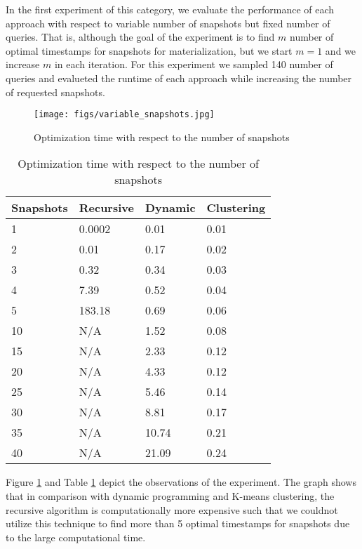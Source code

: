 In the first experiment of this category, we evaluate the performance of each approach with respect to variable number of snapshots but fixed number of queries. That is, although the goal of the experiment is to find $m$ number of optimal timestamps for snapshots for materialization, but we start $m=1$ and we increase $m$ in each iteration. For this experiment we sampled 140 number of queries and evalueted the runtime of each approach while increasing the number of requested snapshots.

\begin{figure}
	\label{fig:variable_snapshots}
	\centering
	\texttt{[image: figs/variable\_snapshots.jpg]}
	\caption{Optimization time with respect to the number of snapshots}
\end{figure} 


\begin {center}
\begin{table}
	\centering
	\caption{Optimization time with respect to the number of snapshots}
	\label {table:variable_snapshots}
	\begin{tabular}{p{2cm}p{3cm}p{3cm}p{3cm}}
		\hline
		Snapshots & Recursive      & Dynamic  & Clustering \\ \hline
		1 & 0.0002    & 0.01  & 0.01  \\  
		2 & 0.01    & 0.17  & 0.02  \\
		3 & 0.32    & 0.34  & 0.03  \\
		4 & 7.39 & 0.52  & 0.04  \\
		5 & 183.18 & 0.69  & 0.06 \\
		10 & N/A    & 1.52  & 0.08  \\
		15 & N/A & 2.33  & 0.12  \\ 
		20 & N/A & 4.33  & 0.12  \\ 
		25 & N/A & 5.46  & 0.14  \\ 
		30 & N/A & 8.81  & 0.17  \\
		35 & N/A & 10.74  & 0.21  \\
		40 & N/A & 21.09  & 0.24  \\\hline
	\end{tabular}
\end{table}
\end{center}

Figure \ref{fig:variable_snapshots} and Table \ref{table:variable_snapshots} depict the observations of the experiment. The graph shows that in comparison with dynamic programming and K-means clustering, the recursive algorithm is computationally more expensive such that we couldnot utilize this technique to find more than 5 optimal timestamps for snapshots due to the large computational time. 

